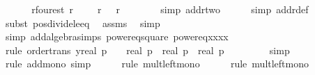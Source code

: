 \begin{isabellebody}
\isanewline
\ \ \isanewline
\ \ \isamarkupfalse%
\ r{\isacharunderscore}{\kern0pt}four{\isacharunderscore}{\kern0pt}est{\isacharcolon}{\kern0pt}\ {\isachardoublequoteopen}r\ {}\ {\isasymle}\ {}\ {\isacharasterisk}{\kern0pt}\ r\ {}\ {\isacharasterisk}{\kern0pt}\ r\ {}{\isachardoublequoteclose}\ \isanewline
\ \ \ \ \isamarkupfalse%
\ {\isacharparenleft}{\kern0pt}simp\ add{\isacharcolon}{\kern0pt}r{\isacharunderscore}{\kern0pt}two{\isacharparenright}{\kern0pt}\isanewline
\ \ \ \ \isamarkupfalse%
\ {\isacharparenleft}{\kern0pt}simp\ add{\isacharcolon}{\kern0pt}r{\isacharunderscore}{\kern0pt}def{\isacharparenright}{\kern0pt}\isanewline
\ \ \ \ \isamarkupfalse%
\ {\isacharparenleft}{\kern0pt}subst\ pos{\isacharunderscore}{\kern0pt}divide{\isacharunderscore}{\kern0pt}le{\isacharunderscore}{\kern0pt}eq{\isacharparenright}{\kern0pt}\ \isamarkupfalse%
\ assms\ \isamarkupfalse%
\ simp\isanewline
\ \ \ \ \isamarkupfalse%
\ {\isacharparenleft}{\kern0pt}simp\ add{\isacharcolon}{\kern0pt}algebra{\isacharunderscore}{\kern0pt}simps\ power{}{\isacharunderscore}{\kern0pt}eq{\isacharunderscore}{\kern0pt}square\ power{}{\isacharunderscore}{\kern0pt}eq{\isacharunderscore}{\kern0pt}xxxx{\isacharparenright}{\kern0pt}\isanewline
\ \ \ \ \isamarkupfalse%
\ {\isacharparenleft}{\kern0pt}rule\ order{\isacharunderscore}{\kern0pt}trans{\isacharbrackleft}{\kern0pt}\ y{\isacharequal}{\kern0pt}{\isachardoublequoteopen}real\ p\ {\isacharasterisk}{\kern0pt}\ {}{}\ {\isacharplus}{\kern0pt}\ real\ p\ {\isacharasterisk}{\kern0pt}\ {\isacharparenleft}{\kern0pt}real\ p\ {\isacharasterisk}{\kern0pt}\ {\isacharparenleft}{\kern0pt}real\ p\ {\isacharasterisk}{\kern0pt}\ {}{}{\isacharparenright}{\kern0pt}{\isacharparenright}{\kern0pt}{\isachardoublequoteclose}{\isacharbrackright}{\kern0pt}{\isacharparenright}{\kern0pt}\isanewline
\ \ \ \ \ \isamarkupfalse%
\ simp\isanewline
\ \ \ \ \isamarkupfalse%
\ {\isacharparenleft}{\kern0pt}rule\ add{\isacharunderscore}{\kern0pt}mono{\isacharcomma}{\kern0pt}\ simp{\isacharparenright}{\kern0pt}\isanewline
\ \ \ \ \isamarkupfalse%
\ {\isacharparenleft}{\kern0pt}rule\ mult{\isacharunderscore}{\kern0pt}left{\isacharunderscore}{\kern0pt}mono{\isacharparenright}{\kern0pt}\isanewline
\ \ \ \ \isamarkupfalse%
\ {\isacharparenleft}{\kern0pt}rule\ mult{\isacharunderscore}{\kern0pt}left{\isacharunderscore}{\kern0pt}mono{\isacharparenright}{\kern0pt}\isanewline

\end{isabellebody}
